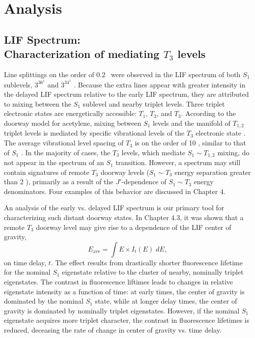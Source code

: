 \section{Analysis}

\subsection{LIF Spectrum: \\Characterization of mediating $T_3$
  levels}

Line splittings on the order of $0.2$ \rcm\ were observed in the LIF
spectrum of both $S_1$ sublevels, $3^36^1$  and $3^34^1$ .
Because the extra lines appear with greater intensity in the delayed
LIF spectrum relative to the early LIF spectrum, they are attributed
to mixing between the $S_1$ sublevel and nearby triplet levels.  Three
triplet electronic states are energetically accessible: $T_1$, $T_2$,
and $T_3$.  According to the doorway model for acetylene, mixing
between $S_1$ levels and the manifold of $T_{1,2}$ triplet levels is
mediated by specific vibrational levels of the $T_3$ electronic state
\cite{dupre91, dupre95a, dupre95b, humphrey97, altunata00, mishra04}.
The average vibrational level spacing of $T_3$ is on the order of 10
\rcm, similar to that of $S_1$ \cite{thom07}.  In the majority of
cases, the $T_3$ levels, which mediate $S_1 \sim T_{1,2}$ mixing, do
not appear in the spectrum of an $S_1$ transition.  However, a
spectrum may still contain signatures of remote $T_3$ doorway
levels ($S_1 \sim T_3$ energy separation greater than 2 \rcm),
primarily as a result of the $J'$-dependence of $S_1 \sim T_3$ energy
denominators.  Four examples of this behavior are discussed in Chapter
4.

An analysis of the early vs. delayed LIF spectrum is our primary tool
for characterizing such distant doorway states.  In Chapter 4.3, it was
shown that a remote $T_3$ doorway level may give rise to a dependence of
the LIF center of gravity,
\begin{equation}
  E_{\text{ave}} = \int E \times I_t(E) \; dE,
\end{equation}
on time delay, $t$.  The effect results from drastically shorter
fluorescence lifetime for the nominal $S_1$ eigenstate relative to the
cluster of nearby, nominally triplet eigenstates.  The contrast in
fluorescence liftimes leads to changes in relative eigenstate
intensity as a function of time: at early times, the center of gravity
is dominated by the nominal $S_1$ state, while at longer delay times,
the center of gravity is dominated by nominally triplet eigenstates.
However, if the nominal $S_1$ eigenstate acquires more triplet
character, the contrast in fluorescence lifetimes is reduced,
deceasing the rate of change in center of gravity vs. time delay.

